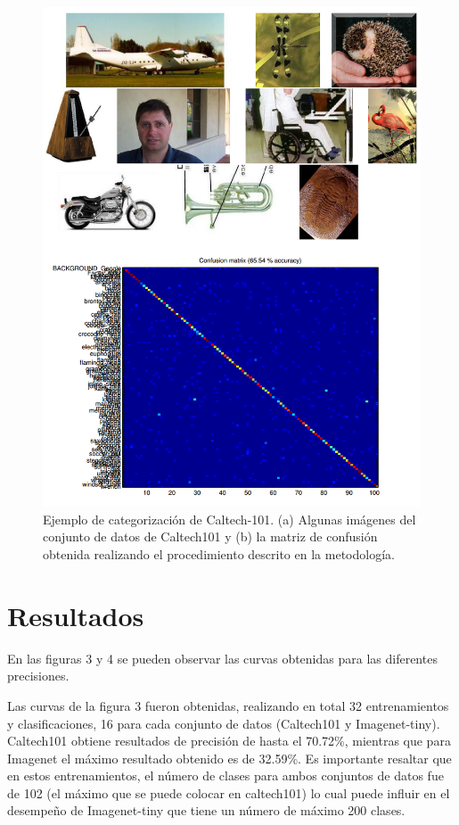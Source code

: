 \documentclass[10pt,twocolumn,letterpaper]{article}
\begin{document}
\begin{figure}[t]
\begin{center}
   \includegraphics[width=1\linewidth]{f2_confusion.png}
\end{center}
   \caption{Ejemplo de categorización de Caltech-101. (a) Algunas imágenes del conjunto de datos de Caltech101 y (b) la matriz de confusión obtenida realizando el procedimiento descrito en la metodología.}
\label{fig:seg}
\end{figure}

\section{Resultados}

En las figuras 3 y 4 se pueden observar las curvas obtenidas para las diferentes precisiones.

Las curvas de la figura 3 fueron obtenidas, realizando en total 32 entrenamientos y clasificaciones, 16 para cada conjunto de datos (Caltech101 y Imagenet-tiny). Caltech101 obtiene resultados de precisión de hasta el 70.72\%, mientras que para Imagenet el máximo resultado obtenido es de 32.59\%. Es importante resaltar que en estos entrenamientos, el número de clases para ambos conjuntos de datos fue de 102 (el máximo que se puede colocar en caltech101) lo cual puede influir en el desempeño de Imagenet-tiny que tiene un número de máximo 200 clases.
\end{document}
